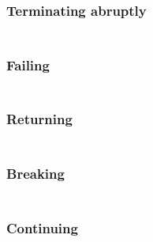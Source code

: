 \subsubsection{Terminating abruptly}\hypertarget{terminating-abruptly}{}\label{terminating-abruptly}

\begin{align*}
  [ \
  \KEY{Funcon} \quad & \NAMEHYPER{../../../../../Funcons-beta/Computations/Abnormal}{Abrupting}{finalise-abrupting}
  \ ]
\end{align*}
\subsubsection{Failing}\hypertarget{failing}{}\label{failing}

\begin{align*}
  [ \
  \KEY{Funcon} \quad & \NAMEHYPER{../../../../../Funcons-beta/Computations/Abnormal}{Failing}{fail} \\
  \KEY{Funcon} \quad & \NAMEHYPER{../../../../../Funcons-beta/Computations/Abnormal}{Failing}{else} \\
  \KEY{Funcon} \quad & \NAMEHYPER{../../../../../Funcons-beta/Computations/Abnormal}{Failing}{checked}
  \ ]
\end{align*}
\subsubsection{Returning}\hypertarget{returning}{}\label{returning}

\begin{align*}
  [ \
  \KEY{Funcon} \quad & \NAMEHYPER{../../../../../Funcons-beta/Computations/Abnormal}{Returning}{return} \\
  \KEY{Funcon} \quad & \NAMEHYPER{../../../../../Funcons-beta/Computations/Abnormal}{Returning}{handle-return}
  \ ]
\end{align*}
\subsubsection{Breaking}\hypertarget{breaking}{}\label{breaking}

\begin{align*}
  [ \
  \KEY{Funcon} \quad & \NAMEHYPER{../../../../../Funcons-beta/Computations/Abnormal}{Breaking}{break} \\
  \KEY{Funcon} \quad & \NAMEHYPER{../../../../../Funcons-beta/Computations/Abnormal}{Breaking}{handle-break}
  \ ]
\end{align*}
\subsubsection{Continuing}\hypertarget{continuing}{}\label{continuing}

